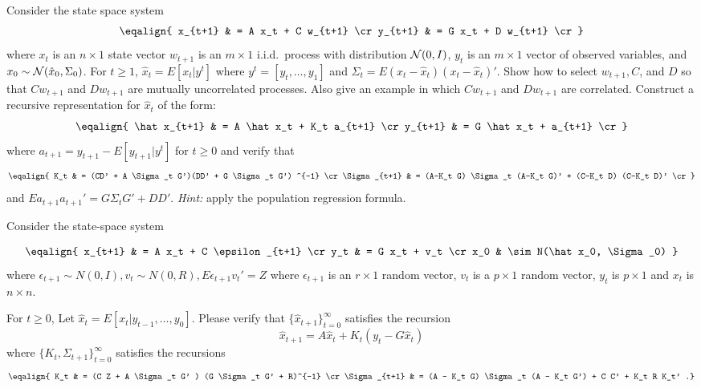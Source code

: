 \medskip
\noindent Consider the state space system
$$ \eqalign{ x_{t+1} & = A  x_t + C w_{t+1} \cr
             y_{t+1} & = G x_t + D w_{t+1} \cr } $$ %
where $x_t $ is an $n \times 1$ state vector $w_{t+1}$ is an $m \times 1$ i.i.d.~process with distribution ${\cal N}(0, I)$, $y_t$
is an $m \times 1$ vector of observed variables, and $x_0 \sim {\cal N}(\hat x_0, \Sigma_0)$.
For $t \geq 1$,   $\hat x_t = E[x_t | y^t]$ where $y^t = [y_t, \ldots, y_1]$ and $\Sigma_t = E (x_t - \hat x_t)(x_t - \hat x_t)'$.
\medskip
{} Show how to select $w_{t+1},  C$, and $D$ so that $C w_{t+1}$ and $D w_{t+1}$ are mutually uncorrelated processes.
Also give an example in which $C w_{t+1}$ and $D w_{t+1}$ are correlated.
\medskip
{}  Construct a recursive representation for $\hat x_t$ of the form:
$$ \eqalign{ \hat x_{t+1} & = A \hat x_t + K_t a_{t+1} \cr
              y_{t+1} & = G \hat x_t + a_{t+1} \cr } $$ %
where $a_{t+1} = y_{t+1} - E [y_{t+1}| y^t]$ for $t\geq 0$ and verify that
$$\eqalign{ K_t  & = (CD' + A \Sigma_t G')(DD' + G \Sigma_t G') ^{-1} \cr
           \Sigma_{t+1} & = (A-K_t G) \Sigma_t (A-K_t G)' + (C-K_t D) (C-K_t D)' \cr}  $$ %
and  $E a_{t+1} a_{t+1}' = G \Sigma_t G' + D D' $.  {\it Hint:} apply the population regression formula.
%




\medskip
{} %

\medskip

\noindent Consider the state-space system

$$ \eqalign{ x_{t+1} & = A x_t + C \epsilon_{t+1} \cr
              y_t &  = G x_t + v_t  \cr
              x_0 & \sim N(\hat x_0, \Sigma_0) }$$
where $\epsilon_{t+1} \sim N(0,I), v_t \sim N(0, R), E \epsilon_{t+1} v_t' = Z $
where $\epsilon_{t+1}$ is an $r \times 1$ random vector, $v_t $ is a $p \times 1$ random vector,
$y_t$ is $p \times 1$ and $x_t $ is $n \times n$.

\medskip
{} For $t \geq 0$, Let $\hat x_t = E [x_t | y_{t-1}, \ldots, y_0 ]$.  Please verify
that $\{\hat x_{t+1}\}_{t=0}^\infty$ satisfies the recursion
$$  \hat x_{t+1}  = A \hat x_t + K_t (y_t - G \hat x_t)  $$
where $\{K_t, \Sigma_{t+1}\}_{t=0}^\infty $ satisfies the recursions
$$\eqalign{
   K_t & = (C Z + A \Sigma_t G' ) (G \Sigma_t G' + R)^{-1} \cr
   \Sigma_{t+1} & = (A - K_t G) \Sigma_t (A - K_t G') + C C' + K_t R K_t' .}
$$

